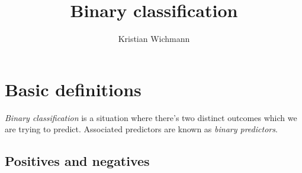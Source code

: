 \documentclass[12pt, a4paper]{article}
\title{Binary classification}
\author{Kristian Wichmann}
\numberwithin{equation}{section}
\begin{document}
\maketitle

\section{Basic definitions}
\textit{Binary classification} is a situation where there's two distinct outcomes which we are trying to predict. Associated predictors are known as \textit{binary predictors}.

\subsection{Positives and negatives}
\end{document}
